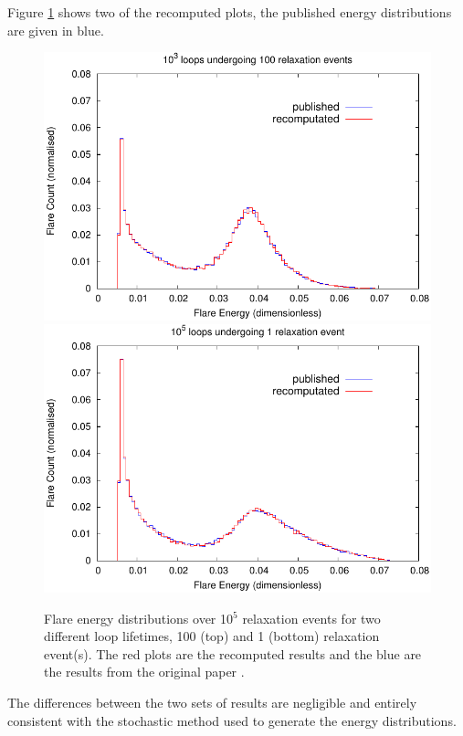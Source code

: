 Figure \ref{fig_recomp_grp3_exp2} shows two of the recomputed plots, the published energy distributions 
  \cite{bareford2010nanoflare} are given in blue.
\begin{figure}
\begin{minipage}{\linewidth} 
  \center
  \includegraphics{../Group_3/wrpf_rx10e5_lle2}\\
  \vspace{5pt}
  \includegraphics[scale=0.001]{../Group_3/wrpf_rx10e5_lle0}
  \caption{\small{Flare energy distributions over 10$^5$ relaxation events for two different loop lifetimes, 100 (top) and 1 (bottom) relaxation event(s). The red plots are the recomputed results and the blue are the results from the original paper \cite{bareford2010nanoflare}.}}
  \label{fig_recomp_grp3_exp2}
\end{minipage} 
\end{figure}
The differences between the two sets of results are negligible and entirely consistent with the stochastic method used to generate the energy distributions.

